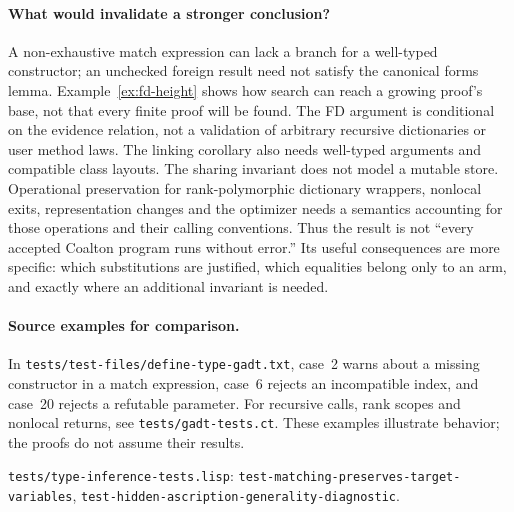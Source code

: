 \documentclass[11pt]{article}
\theoremstyle{definition}
\newcommand{\src}[1]{\nolinkurl{#1}}
\begin{document}
\paragraph{What would invalidate a stronger conclusion?}
A non-exhaustive match expression can lack a branch for a well-typed
constructor; an unchecked foreign result need not satisfy the canonical
forms lemma. Example~\ref{ex:fd-height} shows how search can reach a
growing proof's base, not that every finite proof will be found.
The FD argument is conditional on the evidence relation, not a validation
of arbitrary recursive dictionaries or user method laws. The linking
corollary also needs well-typed arguments and compatible class layouts.
The sharing invariant does not model a mutable store. Operational
preservation for rank-polymorphic dictionary wrappers, nonlocal exits,
representation changes and the optimizer needs a semantics accounting for
those operations and their calling conventions. Thus the result is not
``every accepted Coalton program runs without error.'' Its useful consequences
are more specific: which substitutions are justified, which equalities
belong only to an arm, and exactly where an additional invariant is needed.

\paragraph{Source examples for comparison.}
In \src{tests/test-files/define-type-gadt.txt}, case~2 warns about a
missing constructor in a match expression, case~6 rejects an incompatible
index, and case~20 rejects a refutable parameter. For recursive calls,
rank scopes and nonlocal returns, see \src{tests/gadt-tests.ct}.
These examples illustrate behavior; the proofs do not assume their results.

\sources \src{tests/type-inference-tests.lisp}:
\src{test-matching-preserves-target-variables},
\src{test-hidden-ascription-generality-diagnostic}.
\end{document}
